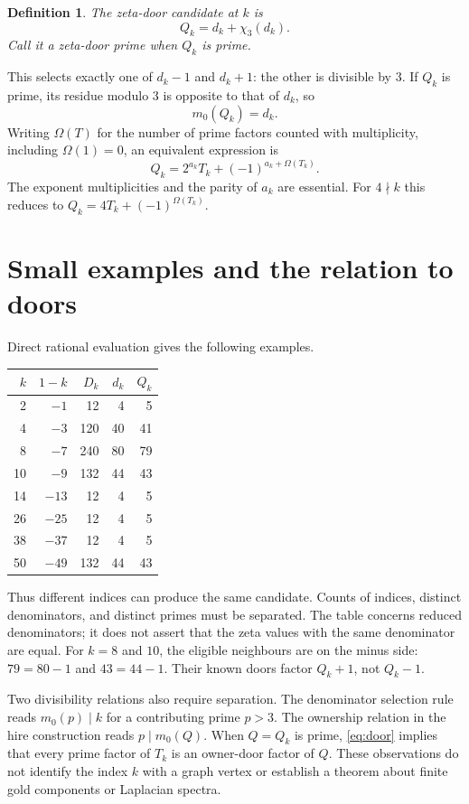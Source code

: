 \documentclass[11pt,a4paper]{article}
\newtheorem{definition}[proposition]{Definition}
\begin{document}
\begin{definition}
The \emph{zeta-door candidate} at $k$ is
\[
 Q_k=d_k+\chi_3(d_k).
\]
Call it a zeta-door prime when $Q_k$ is prime.
\end{definition}
This selects exactly one of $d_k-1$ and $d_k+1$: the other is divisible
by $3$. If $Q_k$ is prime, its residue modulo $3$ is opposite to that
of $d_k$, so
\begin{equation}\label{eq:door}
 m_0(Q_k)=d_k.
\end{equation}
Writing $\Omega(T)$ for the number of prime factors counted with
multiplicity, including $\Omega(1)=0$, an equivalent expression is
\[
 Q_k=2^{a_k}T_k+(-1)^{a_k+\Omega(T_k)}.
\]
The exponent multiplicities and the parity of $a_k$ are essential.
For $4\nmid k$ this reduces to $Q_k=4T_k+(-1)^{\Omega(T_k)}$.

\section{Small examples and the relation to doors}
Direct rational evaluation gives the following examples.
\begin{center}
\begin{tabular}{rrrrr}
\toprule
$k$ & $1-k$ & $D_k$ & $d_k$ & $Q_k$\\
\midrule
2 & $-1$ & 12 & 4 & 5\\
4 & $-3$ & 120 & 40 & 41\\
8 & $-7$ & 240 & 80 & 79\\
10 & $-9$ & 132 & 44 & 43\\
14 & $-13$ & 12 & 4 & 5\\
26 & $-25$ & 12 & 4 & 5\\
38 & $-37$ & 12 & 4 & 5\\
50 & $-49$ & 132 & 44 & 43\\
\bottomrule
\end{tabular}
\end{center}
Thus different indices can produce the same candidate. Counts of
indices, distinct denominators, and distinct primes must be separated.
The table concerns reduced denominators; it does not assert that the
zeta values with the same denominator are equal.
For $k=8$ and $10$, the eligible neighbours are on the minus side:
$79=80-1$ and $43=44-1$. Their known doors factor $Q_k+1$,
not $Q_k-1$.

Two divisibility relations also require separation. The denominator
selection rule reads $m_0(p)\mid k$ for a contributing prime $p>3$.
The ownership relation in the hire construction reads $p\mid m_0(Q)$.
When $Q=Q_k$ is prime, \eqref{eq:door} implies that every prime factor
of $T_k$ is an owner-door factor of $Q$. These observations do not
identify the index $k$ with a graph vertex or establish a theorem about
finite gold components or Laplacian spectra.
\end{document}
